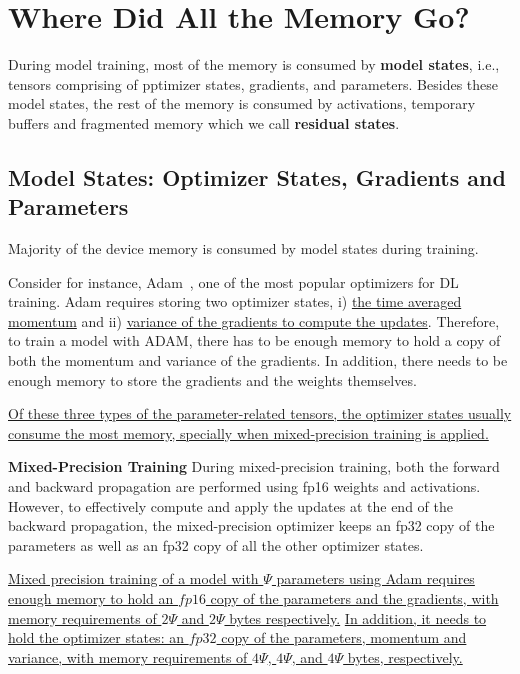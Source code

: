\section{Where Did All the Memory Go?}

During model training, most of the memory is consumed by \textbf{model states}, i.e., tensors comprising of pptimizer states, gradients, and parameters. Besides these model states, the rest of the memory is consumed by activations, temporary buffers and fragmented memory which we call \textbf{residual states}.

\subsection{Model States: Optimizer States, Gradients and Parameters}

Majority of the device memory is consumed by model states during training.

Consider for instance, Adam~\cite{DBLP:journals/corr/Adam}, one of the most popular optimizers for DL training. Adam requires storing two optimizer states, i) \uline{the time averaged momentum} and ii) \uline{variance of the gradients to compute the updates}. Therefore, to train a model with ADAM, there has to be enough memory to hold a copy of both the momentum and variance of the gradients. In addition, there needs to be enough memory to store the gradients and the weights themselves.

\uline{Of these three types of the parameter-related tensors, the optimizer states usually consume the most memory, specially when mixed-precision training is applied.}

\textbf{Mixed-Precision Training} During mixed-precision training, both the forward and backward propagation are performed using fp16 weights and activations. However, to effectively compute and apply the updates at the end of the backward propagation, the mixed-precision optimizer keeps an fp32 copy of the parameters as well as an fp32 copy of all the other optimizer states.

\uline{Mixed precision training of a model with $\Psi$ parameters using Adam requires enough memory to hold an $fp16$ copy of the parameters and the gradients, with memory requirements of $2\Psi$ and $2\Psi$ bytes respectively.} \uline{In addition, it needs to hold the optimizer states: an $fp32$ copy of the parameters, momentum and variance, with memory requirements of $4\Psi$, $4\Psi$, and $4\Psi$ bytes, respectively.}

